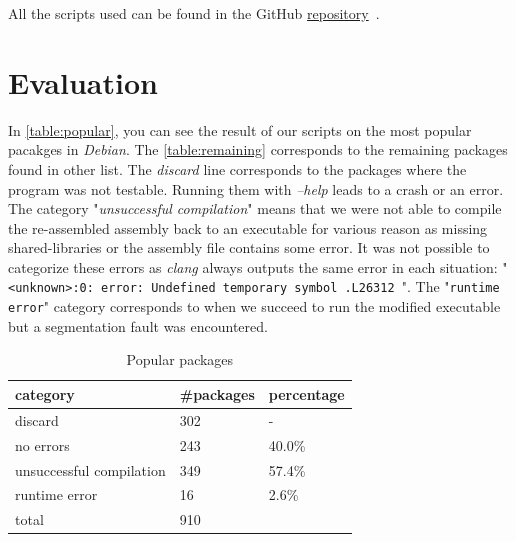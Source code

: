 \documentclass[a4paper,11pt,oneside]{report}
\begin{document}


All the scripts used can be found in the GitHub
\href{https://github.com/ha2san/debian_docker/tree/main/scripts}{repository}~\cite{repo}.

\chapter{Evaluation}

In \autoref{table:popular}, you can see the result of our scripts on the most
popular pacakges in \textit{Debian}. The \autoref{table:remaining}
corresponds to the remaining packages found in other list. The
\textit{discard} line corresponds to the packages where the program was not
testable. Running them with \textit{--help} leads to a crash or an error. 
The category "\textit{unsuccessful compilation}" means that we were not able to
compile the re-assembled assembly back to an executable for various reason as
missing shared-libraries or the assembly file contains some error. It was not
possible to categorize these errors as \textit{clang} always outputs the same
error in each situation: "\texttt{<unknown>:0: error: Undefined temporary symbol .L26312 }".
The "\texttt{runtime error}" category corresponds to when we succeed to run
the modified executable but a segmentation fault was encountered.


\begin{table}[H]
    \centering
    \begin{tabular}{lll}
        \hline
        category                & \#packages & percentage\\
        \hline
        discard                  & 302 & - \\
        no errors                & 243 & 40.0\% \\
        unsuccessful compilation & 349 & 57.4\% \\
        runtime error            & 16  & 2.6\% \\
        \hline
        total                    & 910  \\ 
        \hline
    \end{tabular}
    \caption{Popular packages}
    \label{table:popular}
\end{table}
\end{document}
